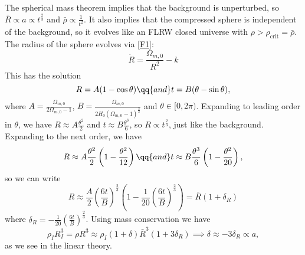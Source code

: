 \documentclass{jknotes}
\begin{document}
\begin{figure}[H]
    \centering
\end{figure}
The spherical mass theorem implies that the background is unperturbed, so \(\bar{R}\propto a\propto t^{\frac23}\) and \(\bar{\rho}\propto\frac1{t^2}\). It also implies that the compressed sphere is independent of the background, so it evolves like an FLRW closed universe with \(\rho>\rho_{\text{crit}} = \bar\rho\). The radius of the sphere evolves via \eqref{F1}:
\begin{equation}
    \dot{R} = \frac{\Omega_{m,0}}{R^2} - k
\end{equation}
This has the solution
\begin{equation}
    R = A(1-\cos\theta) \qq{and} t=B(\theta-\sin\theta),
\end{equation}
where \(A = \frac{\Omega_{m,0}}{2\Omega_{m,0}-1}\), \(B = \frac{\Omega_{m,0}}{2H_0(\Omega_{m,0}-1)^{\frac32}}\) and \(\theta \in [0,2\pi)\). Expanding to leading order in \(\theta\), we have \(R\approx A\frac{\theta^2}{2}\) and \(t\approx B\frac{\theta^3}{6}\), so \(R\propto t^{\frac23}\), just like the background. Expanding to the next order, we have
\begin{equation}
    R\approx A \frac{\theta^2}{2}\left(1-\frac{\theta^2}{12}\right) \qq{and} t \approx B\frac{\theta^3}{6}\left(1-\frac{\theta^2}{20}\right),
\end{equation}
so we can write
\begin{equation}
    R\approx \frac{A}{2}\left(\frac{6t}{B}\right)^{\frac23}\left(1-\frac1{20}\left(\frac{6t}{B}\right)^{\frac23}\right) = \bar{R}(1+\delta_R)
\end{equation}
where \(\delta_R  = -\frac1{20}\left(\frac{6t}{B}\right)^{\frac23}\). Using mass conservation we have
\begin{equation}
    \rho_IR_I^3 = \rho R^3 \approx \rho_I(1+\delta)\bar{R}^3(1+3\delta_R) \implies \delta \approx -3\delta_R \propto a,
\end{equation}
as we see in the linear theory. 
\end{document}
